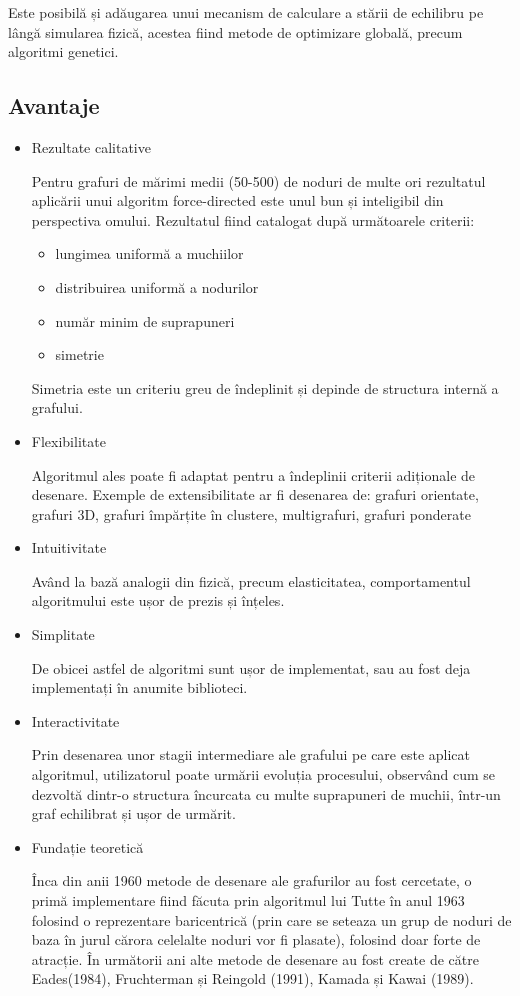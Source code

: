 Este posibilă și adăugarea unui mecanism de calculare a stării de echilibru pe lângă simularea fizică, acestea fiind 
metode de optimizare globală, precum algoritmi genetici.\newline

\subsection{Avantaje}
\begin{itemize}
\item Rezultate calitative

Pentru grafuri de mărimi medii (50-500) de noduri de multe ori rezultatul aplicării unui algoritm force-directed este 
unul bun și inteligibil din perspectiva omului. Rezultatul fiind catalogat după următoarele criterii: 
\begin{itemize}
    \item lungimea uniformă a muchiilor
    \item distribuirea uniformă a nodurilor
    \item număr minim de suprapuneri
    \item simetrie
\end{itemize}

Simetria este un criteriu greu de îndeplinit și depinde de structura internă a grafului.
\item Flexibilitate

Algoritmul ales poate fi adaptat pentru a îndeplinii criterii adiționale de desenare. 
Exemple de extensibilitate ar fi desenarea de: grafuri orientate, grafuri 3D, grafuri împărțite în clustere, multigrafuri, grafuri ponderate

\item Intuitivitate

Având la bază analogii din fizică, precum elasticitatea, comportamentul algoritmului este ușor de prezis și înțeles.
\item Simplitate

De obicei astfel de algoritmi sunt ușor de implementat, sau au fost deja implementați în anumite biblioteci.
\item Interactivitate

Prin desenarea unor stagii intermediare ale grafului pe care este aplicat algoritmul, utilizatorul poate urmării evoluția 
procesului, observând cum se dezvoltă dintr-o structura încurcata cu multe suprapuneri de muchii, într-un graf echilibrat 
și ușor de urmărit.
\item Fundație teoretică

Înca din anii 1960 metode de desenare ale grafurilor au fost cercetate, o primă implementare fiind făcuta 
prin algoritmul lui Tutte în anul 1963 folosind o reprezentare baricentrică (prin care se seteaza un grup de noduri 
de baza în jurul cărora celelalte noduri vor fi plasate), folosind doar forte de atracție. 
În următorii ani alte metode de desenare au fost create de către Eades(1984), Fruchterman și Reingold (1991), Kamada și Kawai (1989).

\end{itemize}

